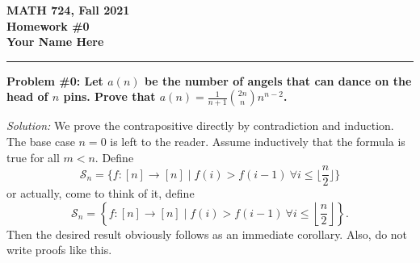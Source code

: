 

\textbf{MATH 724, Fall 2021}\\
\textbf{Homework \#0}\\
\textbf{Your Name Here}
\medskip\hrule

\textbf{Problem \#0: Let $a(n)$ be the number of angels that can dance on the head of $n$ pins.  Prove that $a(n)=\frac{1}{n+1}\binom{2n}{n}n^{n-2}$.}

\textit{Solution:} We prove the contrapositive directly by contradiction and induction.  The base case $n=0$ is left to the reader.  Assume inductively that the formula is true for all $m<n$.  Define
\[\mathcal{S}_n=\{f:[n]\to[n] \mid f(i)>f(i-1) \ \forall i\leq\lfloor \frac{n}{2}\rfloor\}\]
or actually, come to think of it, define
\[\mathcal{S}_n=\left\{f:[n]\to[n] \mid f(i)>f(i-1) \ \forall i\leq\left\lfloor \frac{n}{2}\right\rfloor\right\}.\]
Then the desired result obviously follows as an immediate corollary.  Also, do not write proofs like this.
